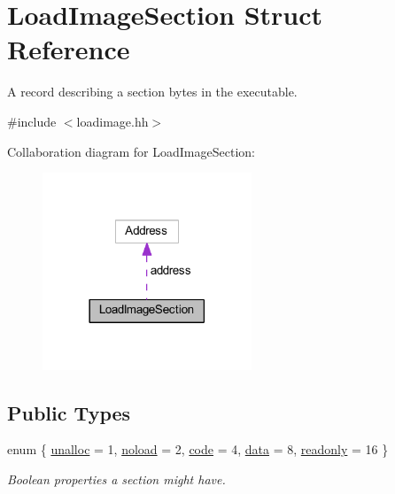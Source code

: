 \hypertarget{struct_load_image_section}{}\section{Load\+Image\+Section Struct Reference}
\label{struct_load_image_section}


A record describing a section bytes in the executable.  




{\ttfamily \#include $<$loadimage.\+hh$>$}



Collaboration diagram for Load\+Image\+Section\+:
\nopagebreak
\begin{figure}[H]
\begin{center}
\leavevmode
\includegraphics[width=177pt]{struct_load_image_section__coll__graph}
\end{center}
\end{figure}
\subsection*{Public Types}
\begin{DoxyCompactItemize}
\item 
enum \{ \newline
\mbox{\hyperlink{struct_load_image_section_ac7b4a598883e0a2572f83fb3e9439d94ad88952fb8fb1b3ce5bc9d2dc137bfc87}{unalloc}} = 1, 
\mbox{\hyperlink{struct_load_image_section_ac7b4a598883e0a2572f83fb3e9439d94a481eddf373fcb9d8025d2c42f7291cdc}{noload}} = 2, 
\mbox{\hyperlink{struct_load_image_section_ac7b4a598883e0a2572f83fb3e9439d94aabcfc59bec5bf4e47ac1371b650c2e83}{code}} = 4, 
\mbox{\hyperlink{struct_load_image_section_ac7b4a598883e0a2572f83fb3e9439d94ac1a3811c9d1146cdc1c8af8ce7e1ee82}{data}} = 8, 
\newline
\mbox{\hyperlink{struct_load_image_section_ac7b4a598883e0a2572f83fb3e9439d94a7ae6028ce4e56ab6be685f9a1e61b4d1}{readonly}} = 16
 \}
\begin{DoxyCompactList}\small\item\em Boolean properties a section might have. \end{DoxyCompactList}\end{DoxyCompactItemize}
